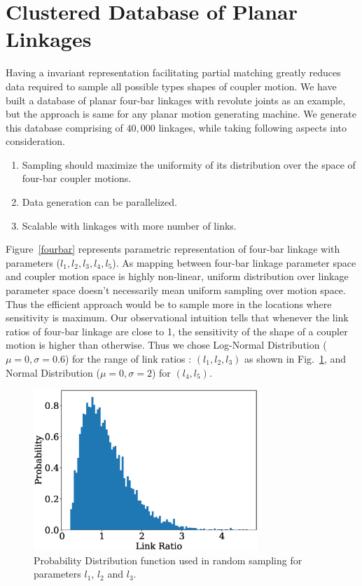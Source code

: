 \documentclass[twocolumn,10pt]{asme2e}
\begin{document}
\section{Clustered Database of Planar Linkages}\label{sec_db_ae}
Having a invariant representation facilitating partial matching greatly reduces data required to sample all possible types shapes of coupler motion.
We have built a database of planar four-bar linkages with revolute joints as an example, but the approach is same for any planar motion generating machine.
We generate this database comprising of $40,000$ linkages, while taking following aspects into consideration.
\begin{enumerate}
  \item Sampling should maximize the uniformity of its distribution over the space of four-bar coupler motions.
  \item Data generation can be parallelized.
  \item Scalable with linkages with more number of links.
\end{enumerate}
Figure~\ref{fourbar} represents parametric representation of four-bar linkage with parameters ($l_1,l_2,l_3,l_4,l_5$).
As mapping between four-bar linkage parameter space and coupler motion space is highly non-linear, uniform distribution over linkage parameter space doesn't necessarily mean uniform sampling over motion space.
Thus the efficient approach would be to sample more in the locations where sensitivity is maximum.
Our observational intuition tells that whenever the link ratios of four-bar linkage are close to 1, the sensitivity of the shape of a coupler motion is higher than otherwise.
Thus we chose Log-Normal Distribution ($\mu = 0,\sigma = 0.6 $) for the range of link ratios : $(l_1, l_2, l_3)$ as shown in Fig.~\ref{logNormal}, and Normal Distribution ($\mu = 0,\sigma = 2 $) for $(l_4, l_5)$.

\begin{figure}
\centering
\includegraphics[width=240pt]{figure/fig_logNormal.eps}
  \caption{Probability Distribution function used in random sampling for parameters $l_1$, $l_2$ and $l_3$.}
\label{logNormal}
\end{figure}
\end{document}

